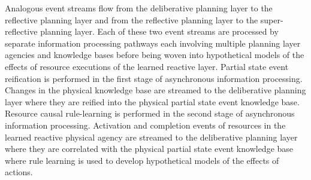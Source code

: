 Analogous event streams flow from the deliberative planning layer to
the reflective planning layer and from the reflective planning layer
to the super-reflective planning layer.  Each of these two event
streams are processed by separate information processing pathways each
involving multiple planning layer agencies and knowledge bases before
being woven into hypothetical models of the effects of resource
executions of the learned reactive layer.  Partial state event
reification is performed in the first stage of asynchronous
information processing.  Changes in the physical knowledge base are
streamed to the deliberative planning layer where they are reified
into the physical partial state event knowledge base.  Resource causal
rule-learning is performed in the second stage of asynchronous
information processing.  Activation and completion events of resources
in the learned reactive physical agency are streamed to the
deliberative planning layer where they are correlated with the
physical partial state event knowledge base where rule learning is
used to develop hypothetical models of the effects of actions.

